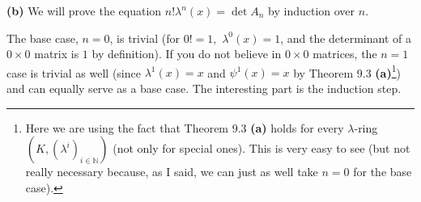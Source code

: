 \documentclass[numbers=enddot,12pt,final,onecolumn,notitlepage]{scrartcl}%
\begin{document}
\begin{comment}
-1\right)  ^{j}\psi^{j}\left(  x\right)  T^{j}.$ Together with $\lambda
_{T}\left(  x\right)  =\sum\limits_{i\in\mathbb{N}}\lambda^{i}\left(
x\right)  T^{i}$, this yields%
\[
\lambda_{T}\left(  x\right)  \cdot\widetilde{\psi}_{-T}\left(  x\right)
=\sum_{n\in\mathbb{N}}\sum_{j=1}^{n}\left(  -1\right)  ^{j}\psi^{j}\left(
x\right)  \lambda^{n-j}\left(  x\right)  T^{n}.
\]
On the other hand, $\lambda_{T}\left(  x\right)  =\sum\limits_{i\in\mathbb{N}%
}\lambda^{i}\left(  x\right)  T^{i}=\sum\limits_{n\in\mathbb{N}}\lambda
^{n}\left(  x\right)  T^{n}$ yields $\dfrac{d}{dT}\lambda_{T}\left(  x\right)
=\sum\limits_{n\in\mathbb{N}}n\lambda^{n}\left(  x\right)  T^{n-1}$ and thus
$-T\cdot\dfrac{d}{dT}\lambda_{T}\left(  x\right)  =-\sum\limits_{n\in
\mathbb{N}}n\lambda^{n}\left(  x\right)  T^{n}$. Hence, (\ref{9.ex3.s1})
becomes%
\[
\sum_{n\in\mathbb{N}}\sum_{j=1}^{n}\left(  -1\right)  ^{j}\psi^{j}\left(
x\right)  \lambda^{n-j}\left(  x\right)  T^{n}=-\sum\limits_{n\in\mathbb{N}%
}n\lambda^{n}\left(  x\right)  T^{n}.
\]
Thus, for every $n\in\mathbb{N}$, we have%
\[
\sum_{j=1}^{n}\left(  -1\right)  ^{j}\psi^{j}\left(  x\right)  \lambda
^{n-j}\left(  x\right)  =-n\lambda^{n}\left(  x\right)  .
\]
Dividing this by $-1,$ this becomes%
\[
\sum_{j=1}^{n}\left(  -1\right)  ^{j-1}\psi^{j}\left(  x\right)  \lambda
^{n-j}\left(  x\right)  =n\lambda^{n}\left(  x\right)  ,
\]
which rewrites as%
\[
n\lambda^{n}\left(  x\right)  =\sum_{j=1}^{n}\left(  -1\right)  ^{j-1}\psi
^{j}\left(  x\right)  \lambda^{n-j}\left(  x\right)  =\sum_{i=1}^{n}\left(
-1\right)  ^{i-1}\psi^{i}\left(  x\right)  \lambda^{n-i}\left(  x\right)  ,
\]
which is exactly what Exercise 9.3 \textbf{(a)} claimed.
\end{comment}


\textbf{(b)} We will prove the equation $n!\lambda^{n}\left(  x\right)  =\det
A_{n}$ by induction over $n$.

The base case, $n=0$, is trivial (for $0!=1,$ $\lambda^{0}\left(  x\right)
=1$, and the determinant of a $0\times0$ matrix is $1$ by definition). If you
do not believe in $0\times0$ matrices, the $n=1$ case is trivial as well
(since $\lambda^{1}\left(  x\right)  =x$ and $\psi^{1}\left(  x\right)  =x$ by
Theorem 9.3 \textbf{(a)}\footnote{Here we are using the fact that Theorem 9.3
\textbf{(a)} holds for every $\lambda$-ring $\left(  K,\left(  \lambda
^{i}\right)  _{i\in\mathbb{N}}\right)  $ (not only for special ones). This is
very easy to see (but not really necessary because, as I said, we can just as
well take $n=0$ for the base case).}) and can equally serve as a base case.
The interesting part is the induction step.
\end{document}
